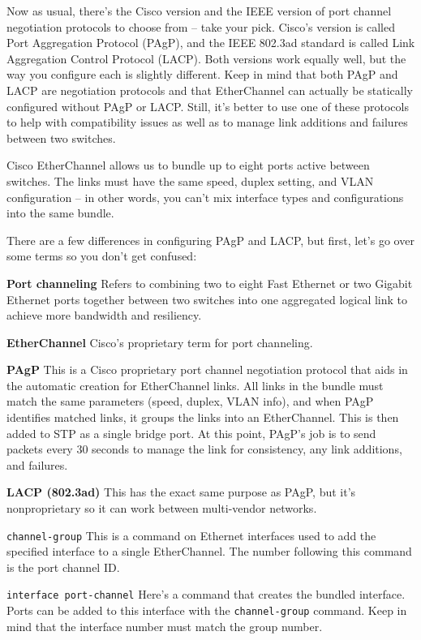 \documentclass[b5paper,11pt]{memoir}
\begin{document}
Now as usual, there's
the Cisco version and the IEEE version of port channel negotiation
protocols to choose from -- take your pick. Cisco's version is called
Port Aggregation Protocol (PAgP), and the IEEE 802.3ad standard is
called Link Aggregation Control Protocol (LACP). Both versions work
equally well, but the way you configure each is slightly different. Keep
in mind that both PAgP and LACP are negotiation protocols and that
EtherChannel can actually be statically configured without PAgP or LACP.
Still, it's better to use one of these protocols to help with
compatibility issues as well as to manage link additions and failures
between two switches.

Cisco EtherChannel allows us to bundle up to eight ports active between
switches. The links must have the same speed, duplex setting, and VLAN
configuration -- in other words, you can't mix interface types and
configurations into the same bundle.

There are a few differences in configuring PAgP and LACP, but first,
let's go over some terms so you don't get confused:

\textbf{Port channeling} Refers to combining two to eight Fast Ethernet
or two Gigabit Ethernet ports together between two switches into one
aggregated logical link to achieve more bandwidth and resiliency.

\textbf{EtherChannel} Cisco's proprietary term for port channeling.

\textbf{PAgP} This is a Cisco proprietary port channel negotiation
protocol that aids in the automatic creation for EtherChannel links. All
links in the bundle must match the same parameters (speed, duplex, VLAN
info), and when PAgP identifies matched links, it groups the links into
an EtherChannel. This is then added to STP as a single bridge port. At
this point, PAgP's job is to send packets every 30 seconds to manage the
link for consistency, any link additions, and failures.

\textbf{LACP (802.3ad)} This has the exact same purpose as PAgP, but
it's nonproprietary so it can work between multi-vendor networks.

\texttt{channel-group} This is a command on Ethernet interfaces used to
add the specified interface to a single EtherChannel. The number
following this command is the port channel ID.

\texttt{interface\ port-channel} Here's a command that creates the
bundled interface. Ports can be added to this interface with the
\texttt{channel-group} command. Keep in mind that the interface number
must match the group number.
\end{document}
